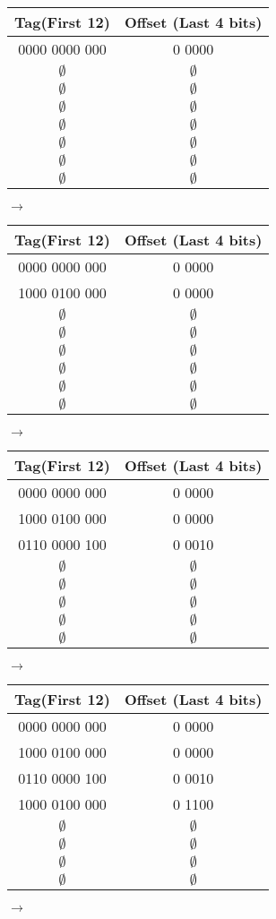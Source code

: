\documentclass{exam}
\begin{document}
\begin{questions}
\begin{tabular}{c c}
\textbf{Tag(First 12)}&\textbf{Offset (Last 4 bits)}\\ [0.5ex]
\hline \hline
0000 0000 000 &0 0000\\
$\emptyset$ & $\emptyset$\\
$\emptyset$ & $\emptyset$\\
$\emptyset$ & $\emptyset$\\
$\emptyset$ & $\emptyset$\\
$\emptyset$ & $\emptyset$\\
$\emptyset$ & $\emptyset$\\
$\emptyset$ & $\emptyset$\\
\end{tabular} $\rightarrow$
\begin{tabular}{c c}
\textbf{Tag(First 12)}&\textbf{Offset (Last 4 bits)}\\ [0.5ex]
\hline \hline
0000 0000 000 &0 0000\\
1000 0100 000 &0 0000\\
$\emptyset$ & $\emptyset$\\
$\emptyset$ & $\emptyset$\\
$\emptyset$ & $\emptyset$\\
$\emptyset$ & $\emptyset$\\
$\emptyset$ & $\emptyset$\\
$\emptyset$ & $\emptyset$\\
\end{tabular} $\rightarrow$

\begin{tabular}{c c}
\textbf{Tag(First 12)}&\textbf{Offset (Last 4 bits)}\\ [0.5ex]
\hline \hline
0000 0000 000 &0 0000\\
1000 0100 000 &0 0000\\
0110 0000 100 & 0 0010\\
$\emptyset$ & $\emptyset$\\
$\emptyset$ & $\emptyset$\\
$\emptyset$ & $\emptyset$\\
$\emptyset$ & $\emptyset$\\
$\emptyset$ & $\emptyset$\\
\end{tabular} $\rightarrow$
\begin{tabular}{c c}
\textbf{Tag(First 12)}&\textbf{Offset (Last 4 bits)}\\ [0.5ex]
\hline \hline
0000 0000 000 &0 0000\\
1000 0100 000 &0 0000\\
0110 0000 100 & 0 0010\\
1000 0100 000 & 0 1100\\
$\emptyset$ & $\emptyset$\\
$\emptyset$ & $\emptyset$\\
$\emptyset$ & $\emptyset$\\
$\emptyset$ & $\emptyset$\\
\end{tabular} $\rightarrow$


\end{questions}
\end{document}
